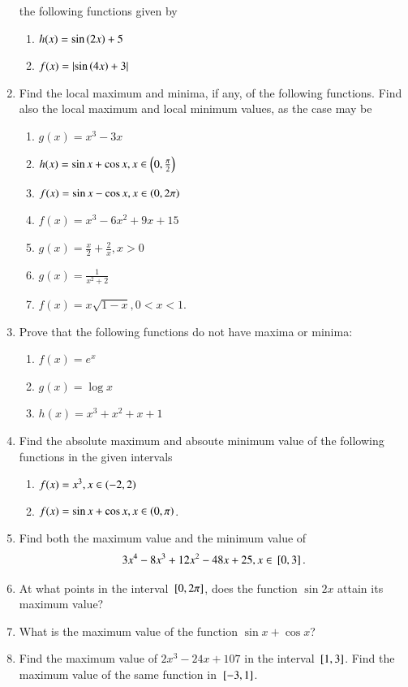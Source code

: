 \begin{enumerate}[label=\arabic*.,ref=\thesubsection.\theenumi]
the following functions given by 
%
\begin{enumerate}
\item $h(x) = \sin\left(2x\right) + 5$
\item $f(x) = \left\vert\sin\left(4x\right) + 3\right\vert$
\end{enumerate}
%
\item Find the local maximum and minima, if any, of
the following functions.  Find also the  local maximum and local minimum values, as the case may be
%
\begin{enumerate}
\item $g(x) = x^3-3x$
\item $h(x) = \sin x +\cos x, x \in \left(0,\frac{\pi}{2}\right)$
\item $f(x) = \sin x -\cos x, x \in \left(0,2\pi\right)$
\item $f(x) = x^3-6x^2+9x+15$
\item $g(x) = \frac{x}{2} + \frac{2}{x}, x > 0$
\item $g(x) = \frac{1}{x^2+2}$
\item $f(x) = x\sqrt{1-x}, 0 < x < 1$.
\end{enumerate}
%
\item Prove that the following functions do not have maxima or minima:
%
\begin{enumerate}
\item $f(x) = e^x$
\item $g(x) = \log x$
\item $h(x) = x^3+x^2+x+1$
\end{enumerate}
\item Find the absolute maximum and absoute minimum value of the following functions in the given intervals
%
\begin{enumerate}
\item $f(x) = x^3, x \in \left(-2,2\right)$
\item $f(x) = \sin x + \cos x,  x \in \left(0,\pi\right)$.
\end{enumerate}
%
\item Find both the maximum value and the minimum value of 
\begin{align}
3x^4-8x^3+12x^2-48x+25, x \in {}\left[0,3\right].
\end{align}
%
\item At what points in the interval ${}\left[0,2\pi\right]$, does the function $\sin 2x$ attain its maximum value?
\item What is the maximum value of the function $\sin x + \cos x$?
\item Find the maximum value of $2x^3-24x+107$ in the interval ${}\left[1,3\right]$.  Find the maximum value of the same function in ${}\left[-3,1\right]$.

\end{enumerate}
